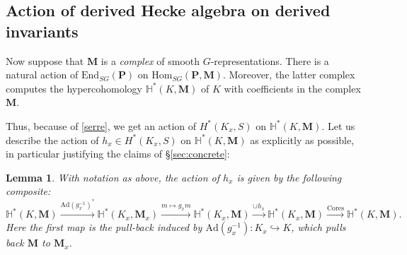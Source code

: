 \documentclass[10pt]{amsart}
\newcommand{\Ad}{\mathrm{Ad}}
\newcommand{\Hom}{\mathrm{Hom}}
\newcommand{\End}{\mathrm{End}}
\newtheorem{lemma}[subsection]{Lemma}
\theoremstyle{remark}
\begin{document}
  \subsection{Action of derived Hecke algebra on derived invariants}
  Now suppose that $\mathbf{M}$ is a {\em complex} of smooth $G$-representations.     There is a natural action of $\End_{SG}(\mathbf{P})$  
 on $\Hom_{SG}(\mathbf{P}, \mathbf{M})$. Moreover, the latter complex computes the hypercohomology  $\mathbb{H}^*(K, \mathbf{M})$
 of $K$ with coefficients in the complex $\mathbf{M}$. 
 
 Thus, because of \eqref{serre}, we get an action of $H^*(K_x, S) $ on $\mathbb{H}^*(K, \mathbf{M})$. Let us 
describe the action of $h_x \in  H^*(K_x,S)$  on $\mathbb{H}^*(K, \mathbf{M})$ as explicitly as possible,  in particular justifying the claims
of \S \ref{sec:concrete}: 

\begin{lemma} 
With notation as above, the  action of $h_x$
is given by the following composite:
 $$ \mathbb{H}^*(K, \mathbf{M}) \stackrel{\Ad(g_x^{-1})^*}{\longrightarrow} \mathbb{H}^*(K_x, \mathbf{M}_x) \stackrel{m \mapsto g_x m}\longrightarrow \mathbb{H}^*(K_x, \mathbf{M}) \stackrel{\cup h_x}{\longrightarrow} \mathbb{H}^*(K_x, \mathbf{M})
\stackrel{\mathrm{Cores}}{\longrightarrow} \mathbb{H}^*(K, \mathbf{M}).$$
 Here the first map is the pull-back induced by $\Ad(g_x^{-1}): K_x \hookrightarrow K$, which pulls back $\mathbf{M}$ to $\mathbf{M}_x$. 
\end{lemma}
\end{document}
